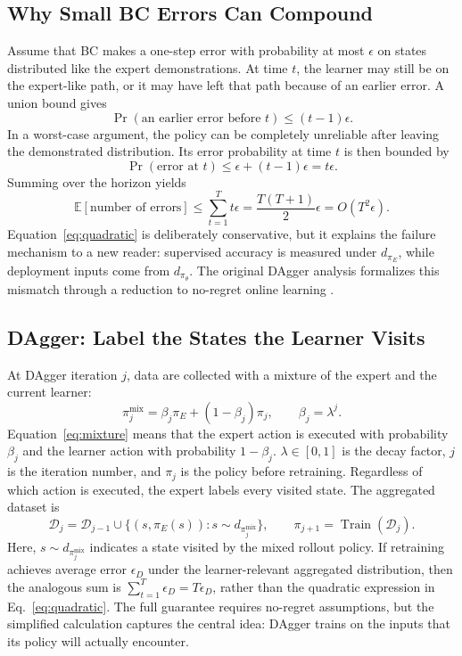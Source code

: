 \documentclass[10pt]{article}
\begin{document}
\subsection{Why Small BC Errors Can Compound}

Assume that BC makes a one-step error with probability at most $\epsilon$ on
states distributed like the expert demonstrations. At time $t$, the learner may
still be on the expert-like path, or it may have left that path because of an
earlier error. A union bound gives
\[
  \Pr(\text{an earlier error before }t)\leq (t-1)\epsilon.
\]
In a worst-case argument, the policy can be completely unreliable after leaving
the demonstrated distribution. Its error probability at time $t$ is then
bounded by
\[
  \Pr(\text{error at }t)
  \leq \epsilon+(t-1)\epsilon=t\epsilon.
\]
Summing over the horizon yields
\begin{equation}
  \mathbb{E}[\text{number of errors}]
  \leq \sum_{t=1}^{T}t\epsilon
  =\frac{T(T+1)}{2}\epsilon
  =O(T^2\epsilon).
  \label{eq:quadratic}
\end{equation}
Equation~\eqref{eq:quadratic} is deliberately conservative, but it explains the
failure mechanism to a new reader: supervised accuracy is measured under
$d_{\pi_E}$, while deployment inputs come from $d_{\pi_\theta}$. The original
DAgger analysis formalizes this mismatch through a reduction to no-regret online
learning \citep{ross2011dagger}.

\subsection{DAgger: Label the States the Learner Visits}

At DAgger iteration $j$, data are collected with a mixture of the expert and the
current learner:
\begin{equation}
  \pi_j^{\mathrm{mix}}
  =\beta_j\pi_E+(1-\beta_j)\pi_j,
  \qquad \beta_j=\lambda^j.
  \label{eq:mixture}
\end{equation}
Equation~\eqref{eq:mixture} means that the expert action is executed with
probability $\beta_j$ and the learner action with probability $1-\beta_j$.
$\lambda\in[0,1]$ is the decay factor, $j$ is the iteration number, and
$\pi_j$ is the policy before retraining. Regardless of which action is executed,
the expert labels every visited state. The aggregated dataset is
\begin{equation}
  \mathcal{D}_{j}
  =\mathcal{D}_{j-1}\cup
  \{(s,\pi_E(s)):s\sim d_{\pi_j^{\mathrm{mix}}}\},
  \qquad
  \pi_{j+1}=\operatorname{Train}(\mathcal{D}_{j}).
  \label{eq:dagger}
\end{equation}
Here, $s\sim d_{\pi_j^{\mathrm{mix}}}$ indicates a state visited by the mixed
rollout policy. If retraining achieves average error $\epsilon_D$ under the
learner-relevant aggregated distribution, then the analogous sum is
$\sum_{t=1}^{T}\epsilon_D=T\epsilon_D$, rather than the quadratic expression in
Eq.~\eqref{eq:quadratic}. The full guarantee requires no-regret assumptions, but
the simplified calculation captures the central idea: DAgger trains on the
inputs that its policy will actually encounter.
\end{document}
